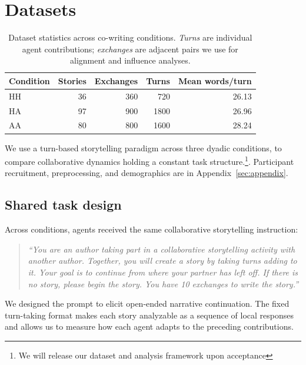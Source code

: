 \documentclass[11pt]{article}
\begin{document}

\section{Datasets}


\begin{table}[t]
\centering
\small
\begin{tabular}{lrrrr}
\toprule
Condition & Stories & Exchanges&Turns& Mean words/turn \\
\midrule
HH & 36& 360 &720& 26.13 \\
HA & 97& 900 &1800& 26.96 \\
AA & 80& 800 &1600& 28.24 \\
\bottomrule
\end{tabular}
\caption{Dataset statistics across co-writing conditions. \textit{Turns} are individual agent contributions; \textit{exchanges} are adjacent pairs we use for alignment and influence analyses.}
\label{tab:dataset}
\end{table}

We use a turn-based storytelling paradigm across three dyadic conditions, to compare collaborative dynamics holding a constant task structure.\footnote{We will release our dataset and analysis framework upon acceptance}. %
Participant recruitment, preprocessing, and demographics are in Appendix~\ref{sec:appendix}.

\subsection{Shared task design}
Across conditions, agents received the same collaborative storytelling instruction:
\begin{quote}
\textit{“You are an author taking part in a collaborative storytelling activity with another author. Together, you will create a story by taking turns adding to it. Your goal is to continue from where your partner has left off. If there is no story, please begin the story. You have 10 exchanges to write the story.”}
\end{quote}
We designed the prompt to elicit open-ended narrative continuation. The fixed turn-taking format makes each story analyzable as a sequence of local responses and allows us to measure how each agent adapts to the preceding contributions.
\end{document}
